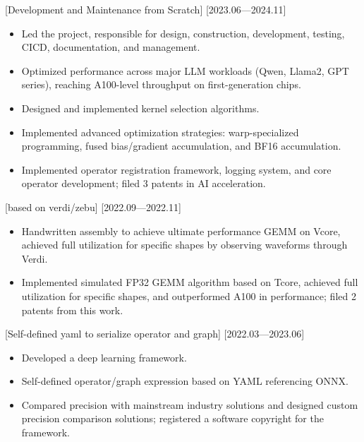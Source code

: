 \documentclass{resume}
\begin{document}
[Development and Maintenance from Scratch]
[2023.06—2024.11]

\begin{itemize}
  \item Led the project, responsible for design, construction, development, testing, CICD, documentation, and management.
  \item Optimized performance across major LLM workloads (Qwen, Llama2, GPT series), reaching A100-level throughput on first-generation chips.
  \item Designed and implemented kernel selection algorithms.
  \item Implemented advanced optimization strategies: warp-specialized programming, fused bias/gradient accumulation, and BF16 accumulation.
  \item Implemented operator registration framework, logging system, and core operator development; filed 3 patents in AI acceleration.
\end{itemize}

[based on verdi/zebu]
[2022.09—2022.11]

\begin{itemize}
  \item Handwritten assembly to achieve ultimate performance GEMM on Vcore, achieved full utilization for specific shapes by observing waveforms through Verdi.
  \item Implemented simulated FP32 GEMM algorithm based on Tcore, achieved full utilization for specific shapes, and outperformed A100 in performance; filed 2 patents from this work.
\end{itemize}

[Self-defined yaml to serialize operator and graph]
[2022.03—2023.06]

\begin{itemize}
  \item Developed a deep learning framework.
  \item Self-defined operator/graph expression based on YAML referencing ONNX.
  \item Compared precision with mainstream industry solutions and designed custom precision comparison solutions; registered a software copyright for the framework.
\end{itemize}

\end{document}
